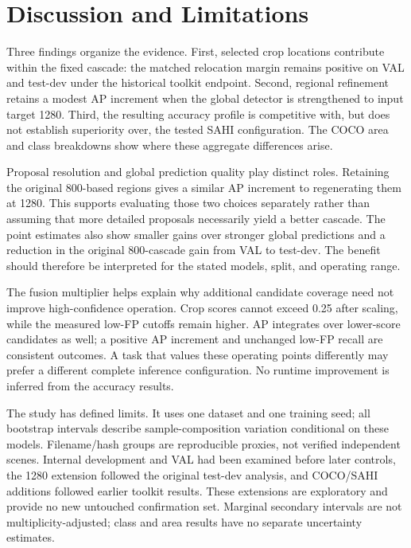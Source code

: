 \documentclass[journal]{IEEEtran}
\begin{document}
\section{Discussion and Limitations}
Three findings organize the evidence. First, selected crop locations contribute within the fixed cascade: the matched relocation margin remains positive on VAL and test-dev under the historical toolkit endpoint. Second, regional refinement retains a modest AP increment when the global detector is strengthened to input target 1280. Third, the resulting accuracy profile is competitive with, but does not establish superiority over, the tested SAHI configuration. The COCO area and class breakdowns show where these aggregate differences arise.

Proposal resolution and global prediction quality play distinct roles. Retaining the original 800-based regions gives a similar AP increment to regenerating them at 1280. This supports evaluating those two choices separately rather than assuming that more detailed proposals necessarily yield a better cascade. The point estimates also show smaller gains over stronger global predictions and a reduction in the original 800-cascade gain from VAL to test-dev. The benefit should therefore be interpreted for the stated models, split, and operating range.

The fusion multiplier helps explain why additional candidate coverage need not improve high-confidence operation. Crop scores cannot exceed 0.25 after scaling, while the measured low-FP cutoffs remain higher. AP integrates over lower-score candidates as well; a positive AP increment and unchanged low-FP recall are consistent outcomes. A task that values these operating points differently may prefer a different complete inference configuration. No runtime improvement is inferred from the accuracy results.

The study has defined limits. It uses one dataset and one training seed; all bootstrap intervals describe sample-composition variation conditional on these models. Filename/hash groups are reproducible proxies, not verified independent scenes. Internal development and VAL had been examined before later controls, the 1280 extension followed the original test-dev analysis, and COCO/SAHI additions followed earlier toolkit results. These extensions are exploratory and provide no new untouched confirmation set. Marginal secondary intervals are not multiplicity-adjusted; class and area results have no separate uncertainty estimates.
\end{document}
